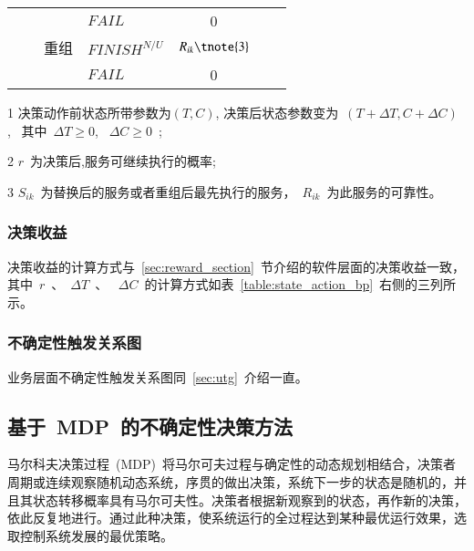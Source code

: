 \begin{table}[htbp]
\begin{threeparttable}
\begin{tabular}{clclccc}
        {}
        & {}
        & {} 
        & {$FAIL$} 
        & {0}
        & {} 
        & {} \\
        
        {}
        & {}
        & {重组} 
        & {$FINISH^{N/U}$} 
        & $R_{ik}\tnote{3}$ 
        & {\multirow{2}{*}{$T_{i0}+\sum\limits_{x = i}^j {({T_{xk}} - {T_{x0}})} $}}
        & {\multirow{2}{*}{$C_{i0}+\sum\limits_{x = i}^j {({C_{xk}} - {C_{x0}})} $}} \\
        
        
        {}
        & {}
        & {} 
        & {$FAIL$} 
        & {0}
        & {} 
        & {} \\

        \bottomrule
    \end{tabular}%
    
    \begin{tablenotes}
        \item[1] 决策动作前状态所带参数为$(T,C)$, 决策后状态参数变为~$(T+\Delta T, C+\Delta C)$,~ 其中~$\Delta T \ge 0$, ~$\Delta C \ge 0$~; 
        \item[2] $r$~为决策后,服务可继续执行的概率;
        \item[3] $S_{ik}$~为替换后的服务或者重组后最先执行的服务，~$R_{ik}$~为此服务的可靠性。
    \end{tablenotes}
\end{threeparttable}
\end{table}%

\subsubsection{决策收益}

决策收益的计算方式与~\ref{sec:reward_section}~节介绍的软件层面的决策收益一致，其中~$r$~、~$\Delta T$~、 ~$\Delta C$~的计算方式如表~\ref{table:state_action_bp}~右侧的三列所示。

\subsubsection{不确定性触发关系图}

业务层面不确定性触发关系图同~\ref{sec:utg}~介绍一直。

\subsection{基于~MDP~的不确定性决策方法}
马尔科夫决策过程~(MDP)~将马尔可夫过程与确定性的动态规划相结合，决策者周期或连续观察随机动态系统，序贯的做出决策，系统下一步的状态是随机的，并且其状态转移概率具有马尔可夫性。决策者根据新观察到的状态，再作新的决策，依此反复地进行。通过此种决策，使系统运行的全过程达到某种最优运行效果，选取控制系统发展的最优策略。

